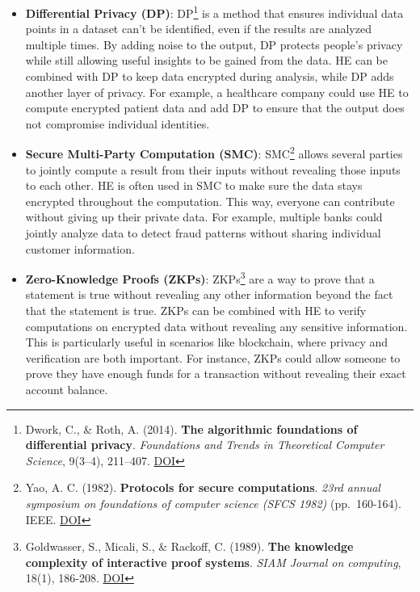 \documentclass[
  letterpaper,
  DIV=11,
  numbers=noendperiod,
  oneside]{scrartcl}
\begin{document}
\begin{itemize}
\item
  \textbf{Differential Privacy (DP)}: DP\footnote{Dwork, C., \& Roth, A.
    (2014). \textbf{The algorithmic foundations of differential
    privacy}. \emph{Foundations and Trends in Theoretical Computer
    Science}, 9(3--4), 211--407.
    \href{https://doi.org/10.1561/0400000042}{DOI}} is a method that
  ensures individual data points in a dataset can't be identified, even
  if the results are analyzed multiple times. By adding noise to the
  output, DP protects people's privacy while still allowing useful
  insights to be gained from the data. HE can be combined with DP to
  keep data encrypted during analysis, while DP adds another layer of
  privacy. For example, a healthcare company could use HE to compute
  encrypted patient data and add DP to ensure that the output does not
  compromise individual identities.
\item
  \textbf{Secure Multi-Party Computation (SMC)}: SMC\footnote{Yao, A. C.
    (1982). \textbf{Protocols for secure computations}. \emph{23rd
    annual symposium on foundations of computer science (SFCS 1982)}
    (pp.~160-164). IEEE.
    \href{https://doi.org/10.1109/SFCS.1982.38}{DOI}} allows several
  parties to jointly compute a result from their inputs without
  revealing those inputs to each other. HE is often used in SMC to make
  sure the data stays encrypted throughout the computation. This way,
  everyone can contribute without giving up their private data. For
  example, multiple banks could jointly analyze data to detect fraud
  patterns without sharing individual customer information.
\item
  \textbf{Zero-Knowledge Proofs (ZKPs)}: ZKPs\footnote{Goldwasser, S.,
    Micali, S., \& Rackoff, C. (1989). \textbf{The knowledge complexity
    of interactive proof systems}. \emph{SIAM Journal on computing},
    18(1), 186-208. \href{https://doi.org/10.1137/0218012}{DOI}} are a
  way to prove that a statement is true without revealing any other
  information beyond the fact that the statement is true. ZKPs can be
  combined with HE to verify computations on encrypted data without
  revealing any sensitive information. This is particularly useful in
  scenarios like blockchain, where privacy and verification are both
  important. For instance, ZKPs could allow someone to prove they have
  enough funds for a transaction without revealing their exact account
  balance.
\end{itemize}
\end{document}
